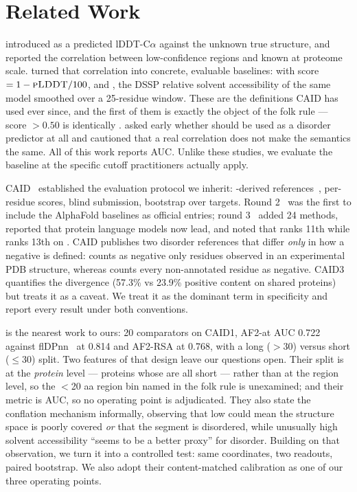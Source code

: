 \section{Related Work}
\label{sec:related}

 \citet{jumper2021} introduced \plddt as a
predicted lDDT-C$\alpha$ against the unknown true structure, and \citet{tunyasuvunakool2021}
reported the correlation between low-confidence regions and known \idrs at proteome scale.
\citet{piovesan2022} turned that correlation into concrete, evaluable baselines:
\afplddt with score $=1-\textsc{pLDDT}/100$, and \afrsa, the DSSP relative solvent accessibility of the
same model smoothed over a 25-residue window. These are the definitions CAID has used ever
since, and the first of them is exactly the object of the folk rule --- score $>0.50$ is
identically \plddtrule. \citet{wilson2022} asked early whether \plddt should be used as a
disorder predictor at all and cautioned that a real correlation does not make the semantics the
same. All of this work reports AUC. Unlike these studies, we evaluate the baseline at the
specific cutoff practitioners actually apply.

 CAID~\citep{necci2021} established the
evaluation protocol we inherit: \disprot-derived references~\citep{quaglia2022}, per-residue
scores, blind submission, bootstrap over targets. Round 2~\citep{delconte2023} was the first to
include the AlphaFold baselines as official entries; round 3~\citep{mehdiabadi2026} added 24
methods, reported that protein language models now lead, and noted that \afplddt ranks 11th
while \afthreeplddt ranks 13th on \dpdb. CAID publishes two disorder references that differ
\emph{only} in how a negative is defined: \dpdb counts as negative only residues observed in an
experimental PDB structure, whereas \dnox counts every non-annotated residue as negative. CAID3
quantifies the divergence (57.3\% vs 23.9\% positive content on shared proteins) but treats it
as a caveat. We treat it as the dominant term in specificity and report every result under both
conventions.

 \citet{kurgan2023} is the nearest work to ours: 20
comparators on CAID1, AF2-\plddt at AUC 0.722 against flDPnn~\citep{hu2021} at 0.814 and
AF2-RSA at 0.768, with a long ($>$30) versus short ($\le$30) \idr split. Two features of that
design leave our questions open. Their split is at the \emph{protein} level --- proteins whose
\idrs are all short --- rather than at the region level, so the $<$20 aa region bin named in the
folk rule is unexamined; and their metric is AUC, so no operating point is adjudicated. They
also state the conflation mechanism informally, observing that low \plddt could mean the
structure space is poorly covered \emph{or} that the segment is disordered, while unusually high
solvent accessibility ``seems to be a better proxy'' for disorder. Building on that observation,
we turn it into a controlled test: same coordinates, two readouts, paired bootstrap. We also
adopt their content-matched calibration as one of our three operating points.

